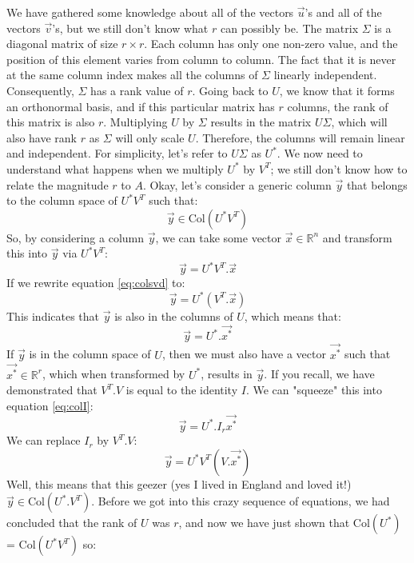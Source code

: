 \documentclass[600paper, 11pt,twoside,openany]{kdp}
\begin{document}
\indent We have gathered some knowledge about all of the vectors $\overrightarrow{u}$’s and all of the vectors  $\overrightarrow{v}$’s, but we still don’t know what $r$ can possibly be. The matrix $\Sigma$ is a diagonal matrix of size $r \times r$. Each column has only one non-zero value, and the position of this element varies from column to column. The fact that it is never at the same column index makes all the columns of $\Sigma$ linearly independent. Consequently, $\Sigma$ has a rank value of $r$. Going back to $U$, we know that it forms an orthonormal basis, and if this particular matrix has $r$ columns, the rank of this matrix is also $r$. Multiplying $U$ by $\Sigma$ results in the matrix $U\Sigma$, which will also have rank $r$ as $\Sigma$ will only scale $U$. Therefore, the columns will remain linear and independent. For simplicity, let’s refer to $U\Sigma$ as $U^*$. We now need to understand what happens when we multiply $U^*$ by $V^T$; we still don’t know how to relate the magnitude $r$ to $A$. Okay, let’s consider a generic column $\overrightarrow{y}$ that belongs to the column space of $U^*V^T$ such that:
\[\overrightarrow{y} \in \textrm{Col}(U^* V^T)\]
\indent So, by considering a column $\overrightarrow{y}$, we can take some vector $\overrightarrow{x} \in \mathbb{R}^n$ and transform this into $\overrightarrow{y}$ via $U^*V^T$:
\begin{equation} \label{eq:colsvd}
\overrightarrow{y} = U^* V^T.\overrightarrow{x}
\end{equation}
\indent If we rewrite equation \ref{eq:colsvd} to:
\[\overrightarrow{y} = U^* \left( V^T.\overrightarrow{x}\right) \]
\indent This indicates that $\overrightarrow{y}$ is also in the columns of $U$, which means that:
\begin{equation}\label{eq:colI}
\overrightarrow{y} = U^*.\overrightarrow{x^*}
\end{equation}
\indent If $\overrightarrow{y}$ is in the column space of $U$, then we must also have a vector $\overrightarrow{x^*}$ such that $\overrightarrow{x^*} \in \mathbb{R}^r$, which when transformed by $U^*$, results in $\overrightarrow{y}$. If you recall, we have demonstrated that $V^T.V$  is equal to the identity $I$. We can "squeeze" this into equation \ref{eq:colI}:
\[\overrightarrow{y} = U^*.I_r\overrightarrow{x^*}\]
\indent We can replace $I_r$ by $V^T.V$:
\[\overrightarrow{y} = U^*V^T\left(V.\overrightarrow{x^*} \right) \]
\indent Well, this means that this geezer (yes I lived in England and loved it!) $\overrightarrow{y} \in \textrm{Col} \left(U^*.V^T \right) $. Before we got into this crazy sequence of equations, we had concluded that the rank of $U$ was $r$, and now we have just shown that $\textrm{Col}\left(U^*\right)$ =  $\textrm{Col}\left(U^*V^T\right)$ so:
\end{document}

